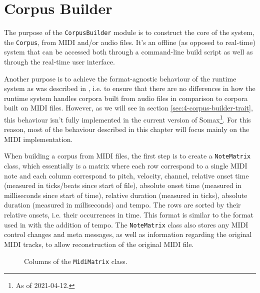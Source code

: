 \section{Corpus Builder}\label{sec:4-corpus-builder}
The purpose of the \texttt{CorpusBuilder} module is to construct the core of the system, the \texttt{Corpus}, from MIDI and/or audio files. It's an offline (as opposed to real-time) system that can be accessed both through a command-line build script as well as through the real-time user interface.

Another purpose is to achieve the format-agnostic behaviour of the runtime system as was described in \cite{somaxtheory2021}, i.e. to ensure that there are no differences in how the runtime system handles corpora built from audio files in comparison to corpora built on MIDI files. However, as we will see in section \ref{sec:4-corpus-builder-trait}, this behaviour isn't fully implemented in the current version of Somax\footnote{As of 2021-04-12.}. For this reason, most of the behaviour described in this chapter will focus mainly on the MIDI implementation.

When building a corpus from MIDI files, the first step is to create a \texttt{Note\-Matrix} class, which essentially is a matrix where each row correspond to a single MIDI note and each column correspond to pitch, velocity, channel, relative onset time (measured in ticks/beats since start of file), absolute onset time (measured in milliseconds since start of time), relative duration (measured in ticks), absolute duration (measured in milliseconds) and tempo. The rows are sorted by their relative onsets, i.e. their occurrences in time. This format is similar to the format used in \cite{eerola2004midi} with the addition of tempo. The \texttt{NoteMatrix} class also stores any MIDI control changes and meta messages, as well as information regarding the original MIDI tracks, to allow reconstruction of the original MIDI file.

\begin{figure}[h!]
\caption{Columns of the \texttt{MidiMatrix} class.}
\label{fig:4-note-matrix}
\end{figure}

